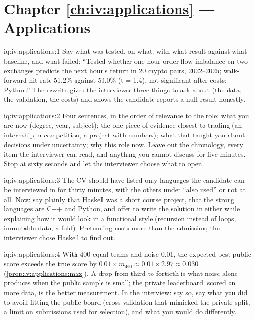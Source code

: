 \section*{Chapter \ref{ch:iv:applications} --- Applications}

\begin{solution}{iq:iv:applications:1}
Say what was tested, on what, with what result against what baseline, and what failed: ``Tested whether
one-hour order-flow imbalance on two exchanges predicts the next hour's return in 20 crypto pairs, 2022--2025;
walk-forward hit rate 51.2\% against 50.0\% (t = 1.4), not significant after costs; Python.'' The rewrite
gives the interviewer three things to ask about (the data, the validation, the costs) and shows the candidate
reports a null result honestly.
\end{solution}

\begin{solution}{iq:iv:applications:2}
Four sentences, in the order of relevance to the role: what you are now (degree, year, subject); the one
piece of evidence closest to trading (an internship, a competition, a project with numbers); what that taught
you about decisions under uncertainty; why this role now. Leave out the chronology, every item the
interviewer can read, and anything you cannot discuss for five minutes. Stop at sixty seconds and let the
interviewer choose what to open.
\end{solution}

\begin{solution}{iq:iv:applications:3}
The CV should have listed only languages the candidate can be interviewed in for thirty minutes, with the
others under ``also used'' or not at all. Now: say plainly that Haskell was a short course project, that the
strong languages are C++ and Python, and offer to write the solution in either while explaining how it would
look in a functional style (recursion instead of loops, immutable data, a fold). Pretending costs more than the
admission; the interviewer chose Haskell to find out.
\end{solution}

\begin{solution}{iq:iv:applications:4}
With 400 equal teams and noise 0.01, the expected best public score exceeds the true score by
$0.01 \times m_{400} \approx 0.01 \times 2.97 \approx 0.030$ (\cref{prop:iv:applications:max}). A drop from third
to fortieth is what noise alone produces when the public sample is small; the private leaderboard, scored on
more data, is the better measurement. In the interview: say so, say what you did to avoid fitting the public
board (cross-validation that mimicked the private split, a limit on submissions used for selection), and what
you would do differently.
\end{solution}

